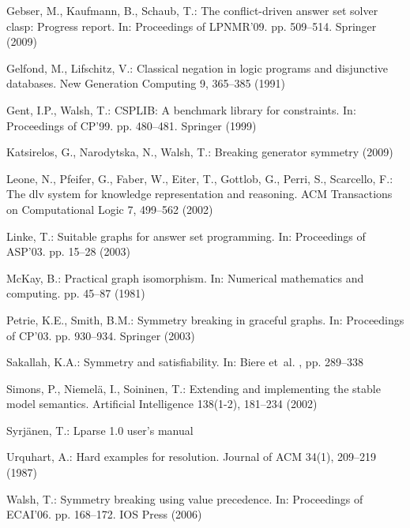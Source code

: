 \documentclass[envcountsame]{llncs}
\begin{document}
\begin{thebibliography}{10}
Gebser, M., Kaufmann, B., Schaub, T.: The conflict-driven answer set solver
  clasp: Progress report. In: Proceedings of LPNMR'09. pp. 509--514. Springer
  (2009)

Gelfond, M., Lifschitz, V.: Classical negation in logic programs and
  disjunctive databases. New Generation Computing  9,  365--385 (1991)

Gent, I.P., Walsh, T.: {CSPLIB}: A benchmark library for constraints. In:
  Proceedings of CP'99. pp. 480--481. Springer (1999)

Katsirelos, G., Narodytska, N., Walsh, T.: Breaking generator symmetry (2009)

Leone, N., Pfeifer, G., Faber, W., Eiter, T., Gottlob, G., Perri, S.,
  Scarcello, F.: The dlv system for knowledge representation and reasoning. ACM
  Transactions on Computational Logic  7,  499--562 (2002)

Linke, T.: Suitable graphs for answer set programming. In: Proceedings of
  ASP'03. pp. 15--28 (2003)

McKay, B.: Practical graph isomorphism. In: Numerical mathematics and
  computing. pp. 45--87 (1981)

Petrie, K.E., Smith, B.M.: Symmetry breaking in graceful graphs. In:
  Proceedings of CP'03. pp. 930--934. Springer (2003)

Sakallah, K.A.: Symmetry and satisfiability. In: Biere et~al.
  \cite{bihemawa09a}, pp. 289--338

Simons, P., Niemel{\"a}, I., Soininen, T.: Extending and implementing the
  stable model semantics. Artificial Intelligence  138(1-2),  181--234 (2002)

Syrj{\"a}nen, T.: Lparse 1.0 user's manual

Urquhart, A.: Hard examples for resolution. Journal of ACM  34(1),  209--219
  (1987)

Walsh, T.: Symmetry breaking using value precedence. In: Proceedings of
  ECAI'06. pp. 168--172. IOS Press (2006)

\end{thebibliography}
\end{document}
